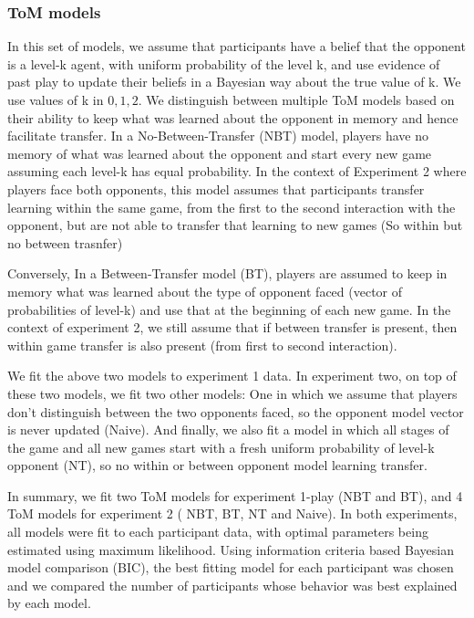 \documentclass[man,floatsintext]{apa6}
\begin{document}
\hypertarget{tom-models}{%
\subsubsection{ToM models}\label{tom-models}}

In this set of models, we assume that participants have a belief that the opponent is a level-k agent, with uniform probability of the level k, and use evidence of past play to update their beliefs in a Bayesian way about the true value of k. We use values of k in \({0,1,2}\). We distinguish between multiple ToM models based on their ability to keep what was learned about the opponent in memory and hence facilitate transfer. In a No-Between-Transfer (NBT) model, players have no memory of what was learned about the opponent and start every new game assuming each level-k has equal probability. In the context of Experiment 2 where players face both opponents, this model assumes that participants transfer learning within the same game, from the first to the second interaction with the opponent, but are not able to transfer that learning to new games (So within but no between trasnfer)

Conversely, In a Between-Transfer model (BT), players are assumed to keep in memory what was learned about the type of opponent faced (vector of probabilities of level-k) and use that at the beginning of each new game. In the context of experiment 2, we still assume that if between transfer is present, then within game transfer is also present (from first to second interaction).

We fit the above two models to experiment 1 data. In experiment two, on top of these two models, we fit two other models: One in which we assume that players don't distinguish between the two opponents faced, so the opponent model vector is never updated (Naive). And finally, we also fit a model in which all stages of the game and all new games start with a fresh uniform probability of level-k opponent (NT), so no within or between opponent model learning transfer.

In summary, we fit two ToM models for experiment 1-play (NBT and BT), and 4 ToM models for experiment 2 ( NBT, BT, NT and Naive). In both experiments, all models were fit to each participant data, with optimal parameters being estimated using maximum likelihood. Using information criteria based Bayesian model comparison (BIC), the best fitting model for each participant was chosen and we compared the number of participants whose behavior was best explained by each model.
\end{document}
